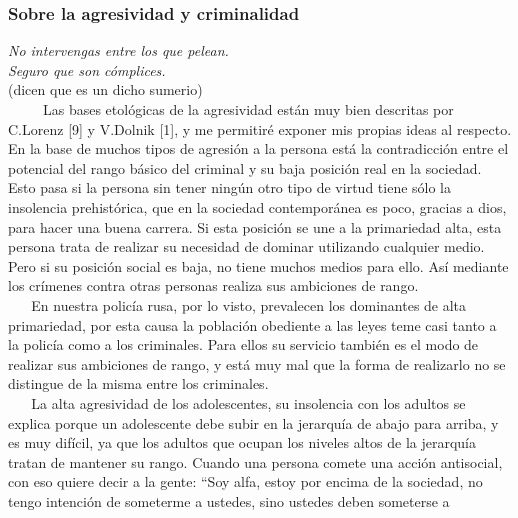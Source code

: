 \protect\hypertarget{M24}{}{}

\hypertarget{sobre-la-agresividad-y-criminalidad}{\subsubsection{Sobre la agresividad y criminalidad}\label{sobre-la-agresividad-y-criminalidad}}

\noindent %
\emph{%
No intervengas entre los que pelean.\\
Seguro que son cómplices.\\}
(dicen que es un dicho sumerio)\\



~ ~ ~ Las bases etológicas de la agresividad están muy bien descritas
por C.Lorenz {[}9{]} y V.Dolnik {[}1{]}, y me permitiré exponer mis
propias ideas al respecto. En la base de muchos tipos de agresión a la
persona está la contradicción entre el potencial del rango básico del
criminal y su baja posición real en la sociedad. Esto pasa si la persona
sin tener ningún otro tipo de virtud tiene sólo la insolencia
prehistórica, que en la sociedad contemporánea es poco, gracias a dios,
para hacer una buena carrera. Si esta posición se une a la primariedad
alta, esta persona trata de realizar su necesidad de dominar utilizando
cualquier medio. Pero si su posición social es baja, no tiene muchos
medios para ello. Así mediante los crímenes contra otras personas
realiza sus ambiciones de rango.\\
\hspace*{0.333em} ~ ~ En nuestra policía rusa, por lo visto, prevalecen
los dominantes de alta primariedad, por esta causa la población
obediente a las leyes teme casi tanto a la policía como a los
criminales. Para ellos su servicio también es el modo de realizar sus
ambiciones de rango, y está muy mal que la forma de realizarlo no se
distingue de la misma entre los criminales.\\
\hspace*{0.333em} ~ ~ La alta agresividad de los adolescentes, su
insolencia con los adultos se explica porque un adolescente debe subir
en la jerarquía de abajo para arriba, y es muy difícil, ya que los
adultos que ocupan los niveles altos de la jerarquía tratan de mantener
su rango. Cuando una persona comete una acción antisocial, con eso
quiere decir a la gente: ``Soy alfa, estoy por encima de la sociedad, no
tengo intención de someterme a ustedes, sino ustedes deben someterse a
